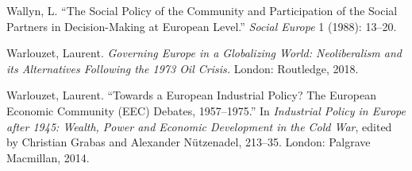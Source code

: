 \documentclass{tufte-handout}
\begin{document}
\begin{hangparas}{.25in}{1}
Wallyn, L. ``The Social Policy of the Community and Participation of the
Social Partners in Decision-Making at European Level.'' \emph{Social
Europe} 1 (1988): 13--20.

Warlouzet, Laurent. \emph{Governing Europe in a Globalizing World:
Neoliberalism and its Alternatives Following the 1973 Oil Crisis.}
London: Routledge, 2018.

Warlouzet, Laurent. ``Towards a European Industrial Policy? The European
Economic Community (EEC) Debates, 1957--1975.'' In \emph{Industrial
Policy in Europe after 1945: Wealth, Power and Economic Development in
the Cold War}, edited by Christian Grabas and Alexander Nützenadel,
213--35. London: Palgrave Macmillan, 2014.



\end{hangparas}
\end{document}

